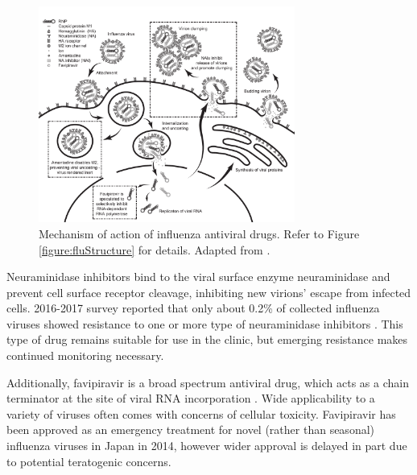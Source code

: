 \begin{figure}
\begin{center}
\includegraphics[width=0.75\textwidth, trim={0cm 0cm 0cm 0cm}, clip]{D_chapters/0_introduction/flu_drug.pdf}
\caption[Mechanism of action of influenza antiviral drugs]{Mechanism of action of influenza antiviral drugs. Refer to Figure \ref{figure:fluStructure} for details. Adapted from \cite{stiver2003treatment}.}
\label{figure:fluDrugs}
\end{center}
\end{figure}

Neuraminidase inhibitors bind to the viral surface enzyme neuraminidase and prevent cell surface receptor cleavage, inhibiting new virions' escape from infected cells. 2016-2017 survey reported that only about 0.2\% of collected influenza viruses showed resistance to one or more type of neuraminidase inhibitors \cite{lackenby2018global}. This type of drug remains suitable for use in the clinic, but emerging resistance makes continued monitoring necessary.

Additionally, favipiravir is a broad spectrum antiviral drug, which acts as a chain terminator at the site of viral RNA incorporation \cite{shiraki2020favipiravir}. Wide applicability to a variety of viruses often comes with concerns of cellular toxicity. Favipiravir has been approved as an emergency treatment for novel (rather than seasonal) influenza viruses in Japan in 2014, however wider approval is delayed in part due to potential teratogenic concerns.
